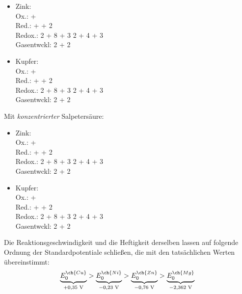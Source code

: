 \documentclass{scrartcl}
\begin{document}
\begin{itemize}
	\item Zink: \\
		Ox.:  \ch{<=>}  +  \\
		Red.:  +    + 2  \\
		Redox.:  2 + 8  + 3 \ch{<=>} 2 + 4  + 3 \\
		Gasentwckl: 2  +  \ch{<=>} 2 
	\item Kupfer: \\
		Ox.:  \ch{<=>}  +  \\
		Red.:  +    + 2  \\
		Redox.:  2 + 8  + 3 \ch{<=>} 2 + 4  + 3 \\
		Gasentwckl: 2  +  \ch{<=>} 2 

\end{itemize}
Mit \emph{konzentrierter} Salpetersäure:
\begin{itemize}
	\item Zink: \\
		Ox.:  \ch{<=>}  +  \\
		Red.:  +    + 2  \\
		Redox.:  2 + 8  + 3 \ch{<=>} 2 + 4  + 3 \\
		Gasentwckl: 2  +  \ch{<=>} 2 
	\item Kupfer: \\
		Ox.:  \ch{<=>}  +  \\
		Red.:  +    + 2  \\
		Redox.:  2 + 8  + 3 \ch{<=>} 2 + 4  + 3 \\
		Gasentwckl: 2  +  \ch{<=>} 2 


	

\end{itemize}
Die Reaktionsgeschwindigkeit und die Heftigkeit derselben lassen auf folgende Ordnung der Standardpotentiale schließen, die mit den tatsächlichen Werten übereinstimmt:
\begin{equation}
	\underbrace{E^{\ch{Cu}}_0}_{+0,35 \text{ V}} > \underbrace{E^{\ch{Ni}}_0}_{-0,23\text{ V}} > \underbrace{E^{\ch{Zn}}_0}_{-0,76\text{ V}} > \underbrace{E^{\ch{Mg}}_0}_{-2,362 \text{ V}}
\end{equation}
\end{document}
